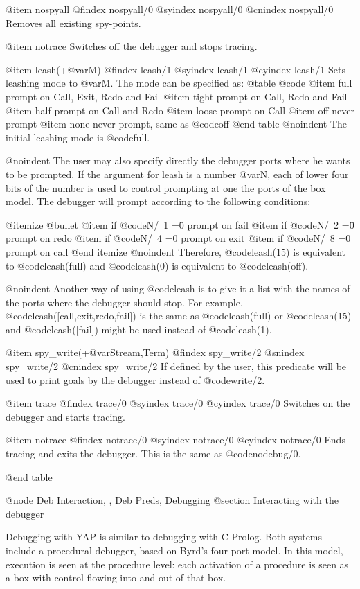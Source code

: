 {{{{{{{{@item nospyall
@findex nospyall/0
@syindex nospyall/0
@cnindex nospyall/0
Removes all existing spy-points.

@item notrace
Switches off the debugger and stops tracing.

@item leash(+@var{M})
@findex leash/1
@syindex leash/1
@cyindex leash/1
 Sets leashing mode to @var{M}.
The mode can be specified as:
@table @code
@item full
prompt on Call, Exit, Redo and Fail
@item tight
prompt on Call, Redo and Fail
@item half
prompt on Call and Redo
@item loose
prompt on Call
@item off
never prompt
@item none
never prompt, same as @code{off}
@end table
@noindent
The initial leashing mode is @code{full}.


@noindent
The user may also specify directly the debugger ports 
where he wants to be prompted. If the argument for leash 
is a number @var{N}, each of lower four bits of the number is used to
control prompting at one the ports of the box model. The debugger will 
prompt according to the following conditions:

@itemize @bullet
@item
if @code{N/\ 1 =\= 0}  prompt on fail 
@item
if @code{N/\ 2 =\= 0} prompt on redo
@item
if @code{N/\ 4 =\= 0} prompt on exit
@item
if @code{N/\ 8 =\= 0} prompt on call
@end itemize
@noindent
Therefore, @code{leash(15)} is equivalent to @code{leash(full)} and
@code{leash(0)} is equivalent to @code{leash(off)}.

@noindent
Another way of using @code{leash} is to give it a list with the names of
the ports where the debugger should stop. For example,
@code{leash([call,exit,redo,fail])} is the same as @code{leash(full)} or
@code{leash(15)} and @code{leash([fail])} might be used instead of
@code{leash(1)}.

@item spy_write(+@var{Stream},Term)
@findex spy_write/2
@snindex spy_write/2
@cnindex spy_write/2
If defined by the user, this predicate will be used to print goals by
the debugger instead of @code{write/2}.

@item trace
@findex trace/0
@syindex trace/0
@cyindex trace/0
Switches on the debugger and starts tracing.

@item notrace
@findex notrace/0
@syindex notrace/0
@cyindex notrace/0
Ends tracing and exits the debugger. This is the same as
@code{nodebug/0}.

@end table


@node Deb Interaction, , Deb Preds, Debugging
@section Interacting with the debugger

Debugging with YAP is similar to debugging with C-Prolog. Both systems
include a procedural debugger, based on Byrd's four port model. In this
model, execution is seen at the procedure level: each activation of a
procedure is seen as a box with control flowing into and out of that
box.

}}}}}}}}
